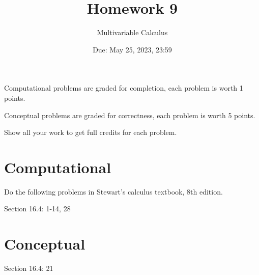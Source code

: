 \documentclass[12pt]{article}
\title{Homework 9}
\author{ Multivariable Calculus}
\date{Due: May 25, 2023, 23:59}
\theoremstyle{definition}
\begin{document}
\maketitle

Computational problems are graded for completion, each problem is worth 1 points.

Conceptual problems are graded for correctness, each problem is worth 5 points.

Show all your work to get full credits for each problem.

\section{Computational}
Do the following problems in Stewart's calculus textbook, 8th edition.

Section 16.4: 1-14, 28

\section{Conceptual}

Section 16.4: 21



%
\end{document}
